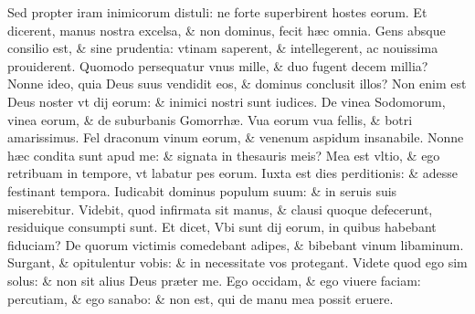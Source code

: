 \documentclass[a5paper,10pt]{book}
\def\ae{æ}
\begin{document}
\begin{multicols*}{2}
\newline \color{red} S\color{black}ed propter iram inimicorum distuli: ne forte superbirent hostes eorum.
\newline \color{red} E\color{black}t dicerent, manus nostra excelsa, \& non dominus, fecit h\ae c omnia.
\newline \color{red} G\color{black}ens absque consilio est, \& sine prudentia: vtinam saperent, \& intellegerent, ac nouissima prouiderent.
\newline \color{red} Q\color{black}uomodo persequatur vnus mille, \& duo fugent decem millia?
\newline \color{red} N\color{black}onne ideo, quia Deus suus vendidit eos, \& dominus conclusit illos?
\newline \color{red} N\color{black}on enim est Deus noster vt dij eorum: \& inimici nostri sunt iudices.
\newline \color{red} D\color{black}e vinea Sodomorum, vinea eorum, \& de suburbanis Gomorrh\ae .
\newline \color{red} V\color{black}ua eorum vua fellis, \& botri amarissimus.%
\newline \color{red} F\color{black}el draconum vinum eorum, \& venenum aspidum insanabile.
\newline \color{red} N\color{black}onne h\ae c condita sunt apud me: \& signata in thesauris meis?
\newline \color{red} M\color{black}ea est vltio, \& ego retribuam in tempore, vt labatur pes eorum.
\newline \color{red} I\color{black}uxta est dies perditionis: \& adesse festinant tempora.
\newline \color{red} I\color{black}udicabit dominus populum suum: \& in seruis suis miserebitur.
\newline \color{red} V\color{black}idebit, quod infirmata sit manus, \& clausi quoque defecerunt, residuique consumpti sunt.
\newline \color{red} E\color{black}t dicet, Vbi sunt dij eorum, in quibus habebant fiduciam?
\newline \color{red} D\color{black}e quorum victimis comedebant adipes, \& bibebant vinum libaminum.
\newline \color{red} S\color{black}urgant, \& opitulentur vobis: \& in necessitate vos protegant.
\newline \color{red} V\color{black}idete quod ego sim solus: \& non sit alius Deus pr\ae ter me.
\newline \color{red} E\color{black}go occidam, \& ego viuere faciam: percutiam, \& ego sanabo: \& non est, qui de manu mea possit eruere.

\end{multicols*}
\end{document}
